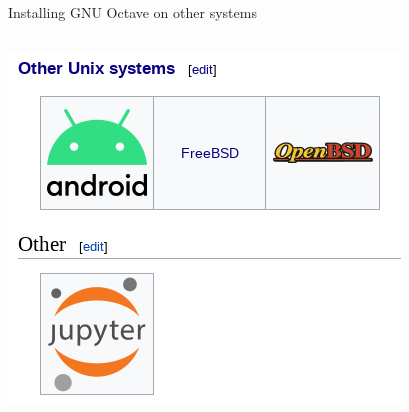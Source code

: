 \begin{frame}{Installing GNU Octave on other systems}
\begin{columns}
\begin{column}{0.35\textwidth}
\includegraphics[width=\textwidth]{res/images/octave_wiki_install_other}
\end{column}
\end{columns}

\end{frame}